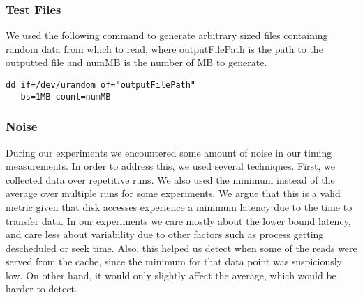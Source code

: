 \subsubsection{Test Files}
We used the following command to generate arbitrary sized files containing random
data from which to read, where outputFilePath is the path to the outputted file 
and numMB is the number of MB to generate.

\begin{verbatim}
dd if=/dev/urandom of="outputFilePath" 
   bs=1MB count=numMB
\end{verbatim}

\subsubsection{Noise}
During our experiments we encountered some amount of noise in our 
timing measurements. In order to address this, we used several techniques. First,
we collected data over repetitive runs. We also used the minimum instead of the average
over multiple runs for some experiments. We argue that this is a valid metric given 
that disk accesses experience a minimum latency due to the time to transfer data.
In our experiments we care mostly about the lower bound latency, and care less about 
variability due to other factors such as process getting descheduled or seek time. Also,
this helped us detect when some of the reads were served from the cache, since the minimum 
for that data point was suspiciously low. On other hand, it would only slightly affect the average,
which would be harder to detect.